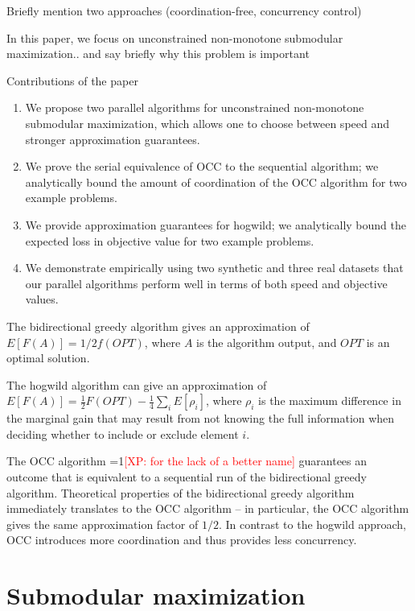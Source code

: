 \documentclass{article} %
\newcommand{\Comments}{1}
\newcommand{\note}[2]{\ifnum\Comments=1\textcolor{#1}{#2}\fi}
\newcommand{\xinghao}[1]{\note{red}{[XP: #1]}}
\begin{document}
Briefly mention two approaches (coordination-free, concurrency control)

In this paper, we focus on unconstrained non-monotone submodular maximization.. and say briefly why this problem is important

Contributions of the paper
\begin{enumerate}
\item We propose two parallel algorithms for unconstrained non-monotone submodular maximization, which allows one to choose between speed and stronger approximation guarantees.
\item We prove the serial equivalence of OCC to the sequential algorithm; we analytically bound the amount of coordination of the OCC algorithm for two example problems.
\item We provide approximation guarantees for hogwild; we analytically bound the expected loss in objective value for two example problems.
\item We demonstrate empirically using two synthetic and three real datasets that our parallel algorithms perform well in terms of both speed and objective values.
\end{enumerate}



The bidirectional greedy algorithm \cite{buchbinder2012} gives an approximation of $E[F(A)] = 1/2 f(OPT)$, where $A$ is the algorithm output, and $OPT$ is an optimal solution.

The hogwild algorithm can give an approximation of $E[F(A)] = \frac{1}{2} F(OPT) - \frac{1}{4}\sum_iE[\rho_i]$, where $\rho_i$ is the maximum difference in the marginal gain that may result from not knowing the full information when deciding whether to include or exclude element $i$.

The OCC algorithm \xinghao{for the lack of a better name} guarantees an outcome that is equivalent to a sequential run of the bidirectional greedy algorithm.
Theoretical properties of the bidirectional greedy algorithm immediately translates to the OCC algorithm -- in particular, the OCC algorithm gives the same approximation factor of $1/2$.
In contrast to the hogwild approach, OCC introduces more coordination and thus provides less concurrency.











\section{Submodular maximization}
\end{document}
